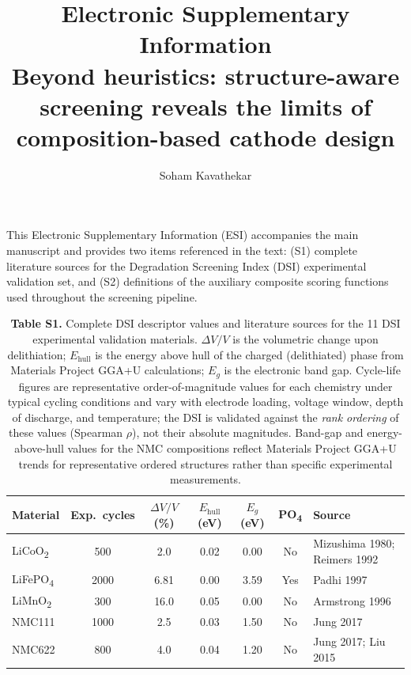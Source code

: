 \documentclass[10pt]{article}
\title{Electronic Supplementary Information\\
\large Beyond heuristics: structure-aware screening reveals the limits of
composition-based cathode design}
\author{Soham Kavathekar}
\date{}
\begin{document}
\maketitle

\noindent This Electronic Supplementary Information (ESI) accompanies the
main manuscript and provides two items referenced in the text: (S1) complete
literature sources for the Degradation Screening Index (DSI) experimental
validation set, and (S2) definitions of the auxiliary composite scoring
functions used throughout the screening pipeline.

\vspace{1em}

\begin{table}[htbp]
\centering
\caption{\textbf{Table S1.} Complete DSI descriptor values and literature
sources for the 11 DSI experimental validation materials. $\Delta V/V$ is the
volumetric change upon delithiation; $E_\mathrm{hull}$ is the energy above
hull of the charged (delithiated) phase from Materials Project GGA+U
calculations; $E_g$ is the electronic band gap. Cycle-life figures are
representative order-of-magnitude values for each chemistry under typical
cycling conditions and vary with electrode loading, voltage window, depth of
discharge, and temperature; the DSI is validated against the \emph{rank
ordering} of these values (Spearman $\rho$), not their absolute magnitudes.
Band-gap and energy-above-hull values for the NMC compositions reflect
Materials Project GGA+U trends for representative ordered structures rather
than specific experimental measurements.}
\label{tab:s1_sources}
\setlength{\tabcolsep}{6pt}
\renewcommand{\arraystretch}{1.25}
\begin{tabular}{l c c c c c l}
\hline
\textbf{Material} & \textbf{Exp.\ cycles} & \textbf{$\Delta V/V$ (\%)} &
\textbf{$E_\mathrm{hull}$ (eV)} & \textbf{$E_g$ (eV)} & \textbf{PO\textsubscript{4}} &
\textbf{Source} \\
\hline
LiCoO\textsubscript{2}      & 500    & 2.0  & 0.02 & 0.00 & No  & Mizushima 1980; Reimers 1992 \\
LiFePO\textsubscript{4}     & 2000   & 6.81 & 0.00 & 3.59 & Yes & Padhi 1997 \\
LiMnO\textsubscript{2}      & 300    & 16.0 & 0.05 & 0.00 & No  & Armstrong 1996 \\
NMC111                      & 1000   & 2.5  & 0.03 & 1.50 & No  & Jung 2017 \\
NMC622                      & 800    & 4.0  & 0.04 & 1.20 & No  & Jung 2017; Liu 2015 \\

\end{tabular}
\end{table}
\end{document}
